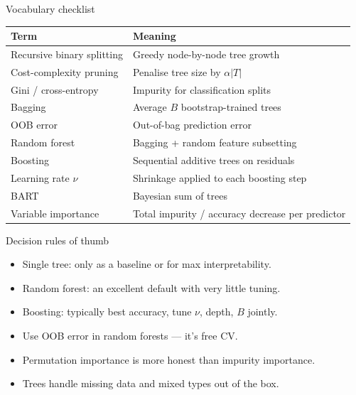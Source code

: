 \documentclass[aspectratio=169,11pt]{beamer}
\begin{document}
\begin{frame}{Vocabulary checklist}
  \footnotesize
  \begin{tabular}{ll}
    \toprule
    \textbf{Term} & \textbf{Meaning} \\
    \midrule
    Recursive binary splitting & Greedy node-by-node tree growth \\
    Cost-complexity pruning & Penalise tree size by $\alpha |T|$ \\
    Gini / cross-entropy & Impurity for classification splits \\
    Bagging & Average $B$ bootstrap-trained trees \\
    OOB error & Out-of-bag prediction error \\
    Random forest & Bagging + random feature subsetting \\
    Boosting & Sequential additive trees on residuals \\
    Learning rate $\nu$ & Shrinkage applied to each boosting step \\
    BART & Bayesian sum of trees \\
    Variable importance & Total impurity / accuracy decrease per predictor \\
    \bottomrule
  \end{tabular}
\end{frame}

\begin{frame}{Decision rules of thumb}
  \begin{itemize}
    \item Single tree: only as a baseline or for max interpretability.
    \item Random forest: an excellent default with very little tuning.
    \item Boosting: typically best accuracy, tune $\nu$, depth, $B$
          jointly.
    \item Use OOB error in random forests --- it's free CV.
    \item Permutation importance is more honest than impurity
          importance.
    \item Trees handle missing data and mixed types out of the box.
  \end{itemize}
\end{frame}
\end{document}
